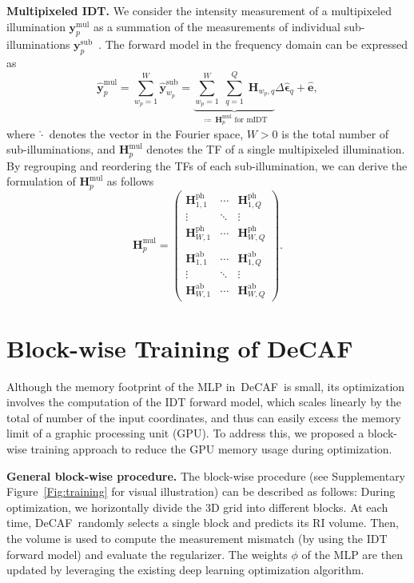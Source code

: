 \documentclass[11pt]{article}
\theoremstyle{plain} %
\def\defn{\,\coloneqq\,}
\def\proposed{DeCAF}
\def\ebm{{\bm{e}}}
\def\ybm{{\bm{y}}}
\def\ybmhat{\widehat{\bm{y}}}
\def\Hbm{{\bm{H}}}
\def\epsilonbm{\bm{\epsilon}}
\begin{document}
\vspace{0.5em}
\noindent
\textbf{Multipixeled IDT.} We consider the intensity measurement of a multipixeled illumination $\ybm^\text{mul}_p$ as a summation of the measurements of individual sub-illuminations $\ybm^\text{sub}_p$~\cite{Matlock.etal2019}. The forward model in the frequency domain can be expressed as
\begin{equation}\label{Eq:mIDT}
\ybmhat^\text{mul}_p = \sum_{w_p=1}^W\ybmhat^\text{sub}_{w_p} = \underbrace{\sum_{w_p=1}^W\;\sum_{q=1}^Q\;\Hbm_{w_p,q}}_{\text{$\defn\Hbm^\text{mul}_p$ for mIDT}}\Delta\widehat{\epsilonbm}_q + \widehat{\ebm},
\end{equation}
where $\widehat{\cdot}$ denotes the vector in the Fourier space, $W>0$ is the total number of sub-illuminations, and $\Hbm^\text{mul}_p$ denotes the TF of a single multipixeled illumination. By regrouping and reordering the TFs of each sub-illumination, we can derive the formulation of $\Hbm^\text{mul}_p$ as follows
\begin{equation}
\Hbm^\text{mul}_p = 
\begin{pmatrix}
\Hbm^\text{ph}_{1,1}&\cdots&\Hbm^\text{ph}_{1,Q}\\
\vdots& \ddots &\vdots\\
\Hbm^\text{ph}_{W,1}&\cdots&\Hbm^\text{ph}_{W,Q}\\ \\
\Hbm^\text{ab}_{1,1}&\cdots&\Hbm^\text{ab}_{1,Q}\\
\vdots& \ddots &\vdots\\
\Hbm^\text{ab}_{W,1}&\cdots&\Hbm^\text{ab}_{W,Q}
\end{pmatrix}.
\end{equation}

\section*{Block-wise Training of \proposed}
Although the memory footprint of the MLP in~\proposed~is small, its optimization involves the computation of the IDT forward model, which scales linearly by the total of number of the input coordinates, and thus can easily excess the memory limit of a graphic processing unit (GPU). To address this, we proposed a block-wise training approach to reduce the GPU memory usage during optimization.

\vspace{0.5em}
\noindent
\textbf{General block-wise procedure.}
The block-wise procedure (see Supplementary Figure~\ref{Fig:training} for visual illustration) can be described as follows: During optimization, we horizontally divide the 3D grid into different blocks. 
At each time, \proposed~randomly selects a single block and predicts its RI volume. Then, the volume is used to compute the measurement mismatch (by using the IDT forward model) and evaluate the regularizer. The weights $\phi$ of the MLP are then updated by leveraging the existing deep learning optimization algorithm.
\end{document}
